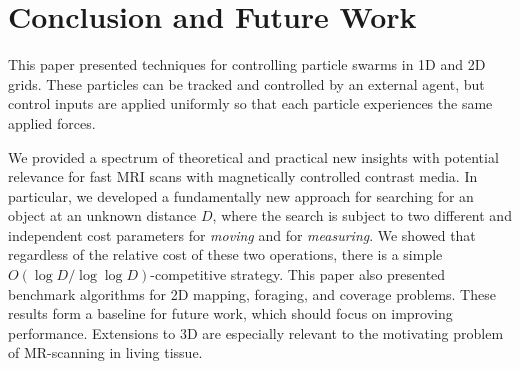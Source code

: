 \section{Conclusion and Future Work}\label{sec:conclusion}

This paper presented techniques for controlling particle swarms in 1D and 2D grids.
These particles can be tracked and controlled by an external agent, but control inputs are applied uniformly so that each particle experiences the same applied forces. 

We provided a spectrum of theoretical and practical new insights  with potential relevance for fast MRI scans with magnetically controlled contrast media.
In particular, we developed a fundamentally new approach 
for searching for an object at an unknown distance $D$, where the search is 
subject to two different and independent cost parameters
for {\em moving} and for {\em measuring}. 
We showed that regardless of the relative cost of these two operations,
there is a simple $O(\log D/\log\log D)$-competitive strategy.
This paper also presented benchmark algorithms for 2D mapping, foraging, and coverage problems.
These results form a baseline for future work, which should focus on improving performance. 
Extensions to 3D are especially relevant to the motivating problem of MR-scanning in living tissue.